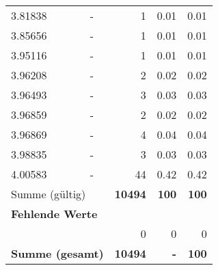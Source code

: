 \begin{longtable}{lXrrr}
        3.81838 & \multicolumn{1}{X}{-} & %
          \num{1} &
          \num[round-mode=places,round-precision=2]{0,01} &
          \num[round-mode=places,round-precision=2]{0,01} \\

        3.85656 & \multicolumn{1}{X}{-} & %
          \num{1} &
          \num[round-mode=places,round-precision=2]{0,01} &
          \num[round-mode=places,round-precision=2]{0,01} \\

        3.95116 & \multicolumn{1}{X}{-} & %
          \num{1} &
          \num[round-mode=places,round-precision=2]{0,01} &
          \num[round-mode=places,round-precision=2]{0,01} \\

        3.96208 & \multicolumn{1}{X}{-} & %
          \num{2} &
          \num[round-mode=places,round-precision=2]{0,02} &
          \num[round-mode=places,round-precision=2]{0,02} \\

        3.96493 & \multicolumn{1}{X}{-} & %
          \num{3} &
          \num[round-mode=places,round-precision=2]{0,03} &
          \num[round-mode=places,round-precision=2]{0,03} \\

        3.96859 & \multicolumn{1}{X}{-} & %
          \num{2} &
          \num[round-mode=places,round-precision=2]{0,02} &
          \num[round-mode=places,round-precision=2]{0,02} \\

        3.96869 & \multicolumn{1}{X}{-} & %
          \num{4} &
          \num[round-mode=places,round-precision=2]{0,04} &
          \num[round-mode=places,round-precision=2]{0,04} \\

        3.98835 & \multicolumn{1}{X}{-} & %
          \num{3} &
          \num[round-mode=places,round-precision=2]{0,03} &
          \num[round-mode=places,round-precision=2]{0,03} \\

        4.00583 & \multicolumn{1}{X}{-} & %
          \num{44} &
          \num[round-mode=places,round-precision=2]{0,42} &
          \num[round-mode=places,round-precision=2]{0,42} \\

     \midrule
     \multicolumn{2}{l}{Summe (gültig)} &
       \textbf{\num{10494}} &
     \textbf{100} &
       \textbf{\num[round-mode=places,round-precision=2]{100}} \\
     \multicolumn{5}{l}{\textbf{Fehlende Werte}}\\
      & & 0 & 0 & 0 \\
     \midrule
     \multicolumn{2}{l}{\textbf{Summe (gesamt)}} &
          \textbf{\num{10494}} &
        \textbf{-} &
        \textbf{100} \\
     \bottomrule
     \end{longtable}
     

